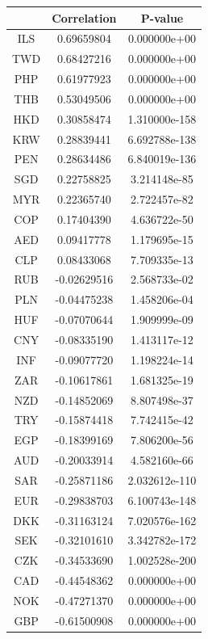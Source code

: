 \documentclass[11pt,preprint, authoryear]{elsarticle}
\let\origtable\table
\let\endorigtable\endtable
\renewenvironment{table}[1][2] {
    \expandafter\origtable\expandafter[H]
} {
    \endorigtable
}
\numberwithin{equation}{section}
\numberwithin{figure}{section}
\numberwithin{table}{section}
\begin{document}
\begin{table}
\begin{center}
\begin{tabular}{|c|c|c|} 
 \hline
 & Correlation & P-value  \\
 \hline
ILS & 0.69659804 & 0.000000e+00 \\
TWD & 0.68427216 & 0.000000e+00 \\
PHP & 0.61977923 & 0.000000e+00 \\
THB & 0.53049506 & 0.000000e+00 \\
HKD & 0.30858474 & 1.310000e-158 \\
KRW & 0.28839441 & 6.692788e-138 \\
PEN &  0.28634486 & 6.840019e-136 \\
SGD & 0.22758825 & 3.214148e-85 \\
MYR & 0.22365740 & 2.722457e-82 \\
COP & 0.17404390 & 4.636722e-50 \\
AED & 0.09417778 & 1.179695e-15 \\
CLP & 0.08433068 & 7.709335e-13 \\
RUB & -0.02629516 & 2.568733e-02 \\
PLN & -0.04475238 & 1.458206e-04 \\
HUF & -0.07070644 & 1.909999e-09 \\
CNY &  -0.08335190 & 1.413117e-12 \\
INF &  -0.09077720 & 1.198224e-14 \\
ZAR & -0.10617861 & 1.681325e-19 \\
NZD & -0.14852069 & 8.807498e-37 \\
TRY & -0.15874418 & 7.742415e-42 \\
EGP & -0.18399169 & 7.806200e-56 \\
AUD & -0.20033914 & 4.582160e-66 \\
SAR & -0.25871186 & 2.032612e-110 \\
EUR & -0.29838703 & 6.100743e-148 \\
DKK &  -0.31163124 & 7.020576e-162 \\
SEK & -0.32101610 & 3.342782e-172 \\
CZK &  -0.34533690 & 1.002528e-200 \\
CAD & -0.44548362 & 0.000000e+00 \\
NOK &  -0.47271370 & 0.000000e+00 \\
GBP &  -0.61500908 & 0.000000e+00 \\
\hline 
\end{tabular}
\caption{Correlation and P-value for the third principal component}
 \label{pca3}
\end{center}
\end{table}


\end{document}
